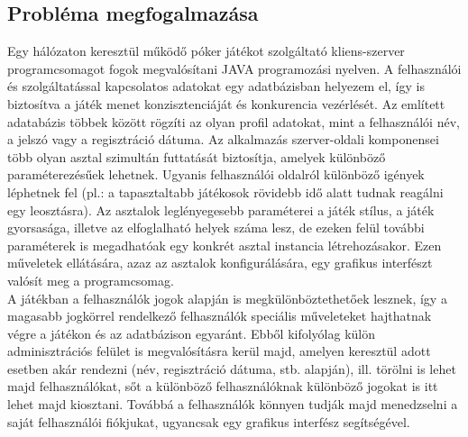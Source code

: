 \subsection{Probléma megfogalmazása}
Egy hálózaton keresztül működő póker játékot szolgáltató kliens-szerver programcsomagot fogok megvalósítani JAVA programozási nyelven. A felhasználói és szolgáltatással kapcsolatos adatokat egy adatbázisban helyezem el, így is biztosítva a játék menet konzisztenciáját és konkurencia vezérlését. Az említett adatabázis többek között rögzíti az olyan profil adatokat, mint a felhasználói név, a jelszó vagy a regisztráció dátuma.
Az alkalmazás szerver-oldali komponensei több olyan asztal szimultán futtatását biztosítja, amelyek különböző paraméterezésűek lehetnek. Ugyanis felhasználói oldalról különböző igények léphetnek fel (pl.: a tapasztaltabb játékosok rövidebb idő alatt tudnak reagálni egy leosztásra). Az asztalok leglényegesebb paraméterei a játék stílus, a játék gyorsasága, illetve az elfoglalható helyek száma lesz, de ezeken felül további paraméterek is megadhatóak egy konkrét asztal instancia létrehozásakor. Ezen műveletek ellátására, azaz az asztalok konfigurálására, egy grafikus interfészt valósít meg a programcsomag. \\
A játékban a felhasználók jogok alapján is megkülönböztethetőek lesznek, így a magasabb jogkörrel rendelkező felhasználók speciális műveleteket hajthatnak végre a játékon és az adatbázison egyaránt. Ebből kifolyólag külön adminisztrációs felület is megvalósításra kerül majd, amelyen keresztül adott esetben akár rendezni (név, regisztráció dátuma, stb. alapján), ill. törölni is lehet majd felhasználókat, sőt a különböző felhasználóknak különböző jogokat is itt lehet majd kiosztani. Továbbá a felhasználók könnyen tudják majd menedzselni a saját felhasználói fiókjukat, ugyancsak egy grafikus interfész segítségével.

